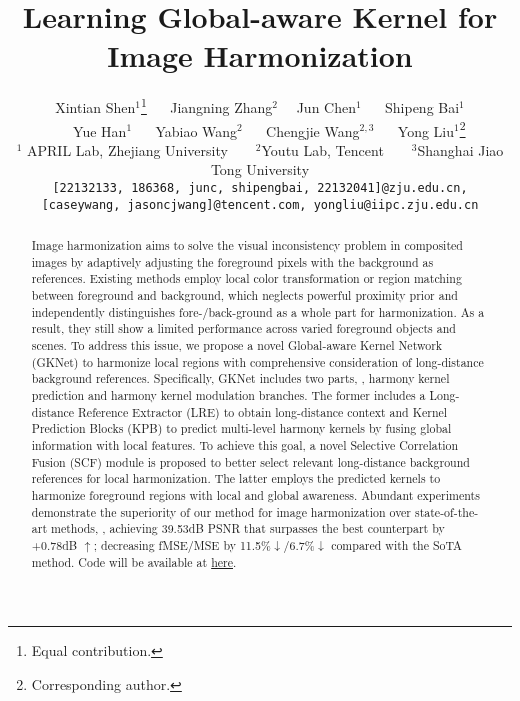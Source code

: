 \documentclass[10pt,twocolumn,letterpaper]{article}
\begin{document}
\title{Learning Global-aware Kernel for Image Harmonization}
\author{Xintian Shen$^1$\thanks{Equal contribution.}
~ ~Jiangning Zhang$^2$\footnotemark[1]
~ ~Jun Chen$^1$
~ ~Shipeng Bai$^1$ \\
~ ~Yue Han$^1$
~ ~Yabiao Wang$^2$
~ ~Chengjie Wang$^{2,3}$
~ ~Yong Liu$^1$\thanks{Corresponding author.} \\
\normalsize $^1$ APRIL Lab, Zhejiang University ~ ~ $^2$Youtu Lab, Tencent ~ ~ $^3$Shanghai Jiao Tong University \\
{\tt\small [22132133, 186368, junc, shipengbai, 
22132041]@zju.edu.cn,} \\
{\tt\small[caseywang, jasoncjwang]@tencent.com, yongliu@iipc.zju.edu.cn}
}


\maketitle
\ificcvfinal\thispagestyle{empty}\fi


\begin{abstract}

Image harmonization aims to solve the visual inconsistency problem in composited images by adaptively adjusting the foreground pixels with the background as references. Existing methods employ local color transformation or region matching between foreground and background, which neglects powerful proximity prior and independently distinguishes fore-/back-ground as a whole part for harmonization. As a result, they still show a limited performance across varied foreground objects and scenes. To address this issue, we propose a novel Global-aware Kernel Network (GKNet) to harmonize local regions with comprehensive consideration of long-distance background references.
Specifically, GKNet includes two parts, \ie, harmony kernel prediction and harmony kernel modulation branches. The former includes a Long-distance Reference Extractor (LRE) to obtain long-distance context and Kernel Prediction Blocks (KPB) to predict multi-level harmony kernels by fusing global information with local features. To achieve this goal, a novel Selective Correlation Fusion (SCF) module is proposed to better select relevant long-distance background references for local harmonization. The latter employs the predicted kernels to harmonize foreground regions with local and global awareness. Abundant experiments demonstrate the superiority of our method for image harmonization over state-of-the-art methods, \eg, achieving 39.53dB PSNR that surpasses the best counterpart by +0.78dB $\uparrow$; decreasing fMSE/MSE by 11.5\%$\downarrow$/6.7\%$\downarrow$ compared with the SoTA method. Code will be available at \href{https://github.com/XintianShen/GKNet}{here}.

\end{abstract}
\end{document}
